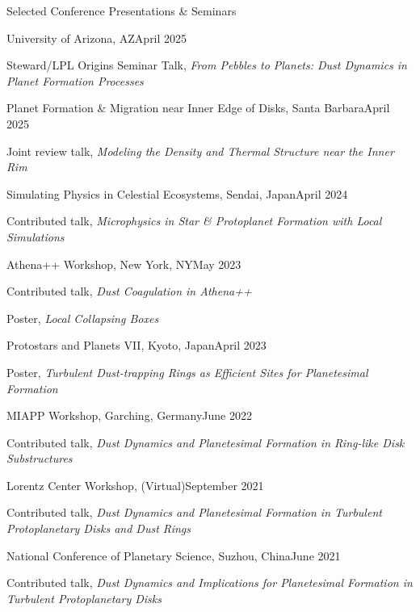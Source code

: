 \documentclass{resume} %
\begin{document}
\begin{rSection}{Selected Conference Presentations \& Seminars}
\begin{rSubsection}{University of Arizona, AZ}{April 2025}{}{}
\item Steward/LPL Origins Seminar Talk, \emph{From Pebbles to Planets: Dust Dynamics in Planet Formation Processes} 
\end{rSubsection}
\begin{rSubsection}{Planet Formation \& Migration near Inner Edge of Disks, Santa Barbara}{April 2025}{}{}
\item Joint review talk, \emph{Modeling the Density and Thermal Structure near the Inner Rim} 
\end{rSubsection}
\begin{rSubsection}{Simulating Physics in Celestial Ecosystems, Sendai, Japan}{April 2024}{}{}
\item Contributed talk, \emph{Microphysics in Star \& Protoplanet Formation with Local Simulations} 
\end{rSubsection}
\begin{rSubsection}{Athena++ Workshop, New York, NY}{May 2023}{}{}
\item Contributed talk, \emph{Dust Coagulation in Athena++} 
\item Poster, \emph{Local Collapsing Boxes} 
\end{rSubsection}
\begin{rSubsection}{Protostars and Planets VII, Kyoto, Japan}{April 2023}{}{}
\item Poster, \emph{Turbulent Dust-trapping Rings as Efficient Sites for Planetesimal Formation} 
\end{rSubsection}
\begin{rSubsection}{MIAPP Workshop, Garching, Germany}{June 2022}{}{}
\item Contributed talk, \emph{Dust Dynamics and Planetesimal Formation in Ring-like Disk Substructures} 
\end{rSubsection}
\begin{rSubsection}{Lorentz Center Workshop, (Virtual)}{September 2021}{}{}
\item Contributed talk, \emph{Dust Dynamics and Planetesimal Formation in Turbulent Protoplanetary Disks and Dust Rings} 
\end{rSubsection}
\begin{rSubsection}{National Conference of Planetary Science, Suzhou, China}{June 2021}{}{}
\item Contributed talk, \emph{Dust Dynamics and Implications for Planetesimal Formation in Turbulent Protoplanetary Disks} 

\end{rSubsection}
\end{rSection}
\end{document}
